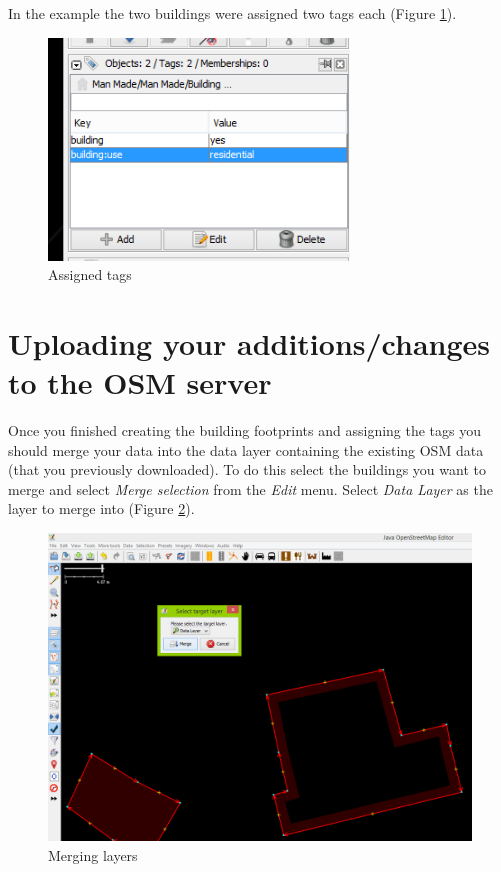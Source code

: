 \documentclass[a4paper,12pt,titlepage]{article}
\begin{document}
In the example the two buildings were assigned two tags each (Figure \ref{fig:building_tags_3}).

\begin{figure}[H]
	\centering
	\includegraphics[width=8cm]{Images/building_tags_3.png}
	\caption{Assigned tags}\label{fig:building_tags_3}
\end{figure}

\section{Uploading your additions/changes to the OSM server}

Once you finished creating the building footprints and assigning the tags you should merge your data into the data layer containing the existing OSM data (that you previously downloaded). To do this select the buildings you want to merge and select \textit{Merge selection} from the \textit{Edit} menu. Select \textit{Data Layer} as the layer to merge into (Figure \ref{fig:merge_layers}). 

\begin{figure}[H]
	\centering
	\includegraphics[width=12cm]{Images/merge_layers.png}
	\caption{Merging layers}\label{fig:merge_layers}
\end{figure}
\end{document}
